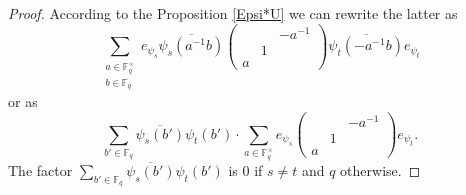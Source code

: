 \documentclass[12pt,reqno]{amsart}
\theoremstyle{definition}
\theoremstyle{remark}
\numberwithin{equation}{section}
\begin{document}
\begin{proof}
    According to the Proposition \ref{Epsi*U} we can rewrite the latter as
    \[
    \sum_{\substack{a \in \mathbb{F}_q^\times\\b \in \mathbb{F}_q}}e_{\psi_s}\overline{\psi_s(a^{-1}b)}\begin{pmatrix}
            & & -a^{-1}\\
            & 1 &\\
            a & &
        \end{pmatrix} \overline{\psi_t(-a^{-1}b)}e_{\psi_t}
    \]
    or as
    \[
    \sum_{b'\in \mathbb{F}_q}\overline{\psi_s(b')}\psi_t(b')\cdot\sum_{a \in \mathbb{F}_q^\times}e_{\psi_s}\begin{pmatrix}
            & & -a^{-1}\\
            & 1 &\\
            a & &
        \end{pmatrix} e_{\psi_t}.
    \]
    The factor $\sum_{b'\in \mathbb{F}_q}\overline{\psi_s(b')}\psi_t(b')$ is $0$ if $s\neq t$ and $q$ otherwise.




\end{proof}
\end{document}
